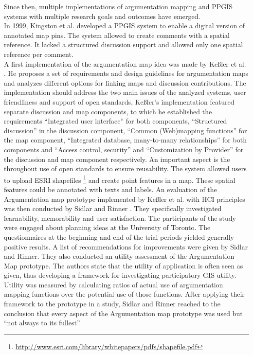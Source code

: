 Since then, multiple implementations of argumentation mapping and PPGIS systems with multiple research goals and outcomes have emerged.\\
In 1999, Kingston et al. \cite{kingston1999gis} developed a PPGIS system to enable a digital version of annotated map pins. The system allowed to create comments with a spatial reference. It lacked a structured discussion support and allowed only one spatial reference per comment.\\
A first implementation of the argumentation map idea was made by Ke{\ss}ler et al. \cite{Kessler2005_ArgumentationMapPrototype}. He proposes a set of requirements and design guidelines for argumentation maps and analyzes different options for linking maps and discussion contributions. The implementation should address the two main issues of the analyzed systems, user friendliness and support of open standards. Ke{\ss}ler's implementation featured separate discussion and map components, to which he established the requirements ``Integrated user interface'' for both components, ``Structured discussion'' in the discussion component, ``Common (Web)mapping functions'' for the map component, ``Integrated database, many-to-many relationships'' for both components and ``Access control, security'' and ``Customization by Provider'' for the discussion and map component respectively. An important aspect is the throughout use of open standards to ensure reusability. The system allowed users to upload ESRI shapefiles \footnote{\url{http://www.esri.com/library/whitepapers/pdfs/shapefile.pdf}} and create point features in a map. These spatial features could be annotated with texts and labels. An evaluation of the Argumentation map prototype implemented by Ke{\ss}ler et al. with HCI principles was then conducted by Sidlar and Rinner \cite{sidlar_argumap_2007}. They specifically investigated learnability, memorability and user satisfaction. The participants of the study were engaged about planning ideas at the University of Toronto. The questionnaires at the beginning and end of the trial periods yielded generally positive results. A list of recommendations for improvements were given by Sidlar and Rinner. They also conducted an utility assessment \cite{Sidlar2009-AssessmentMapGeocollaborationTool} of the Argumentation Map prototype. The authors state that the utility of application is often seen as given, thus developing a framework for investigating participatory GIS utility. Utility was measured by calculating ratios of actual use of argumentation mapping functions over the potential use of those functions. After applying their framework to the prototype in a study, Sidlar and Rinner reached to the conclusion that every aspect of the Argumentation map prototype was used but ``not always to its fullest''.\\
